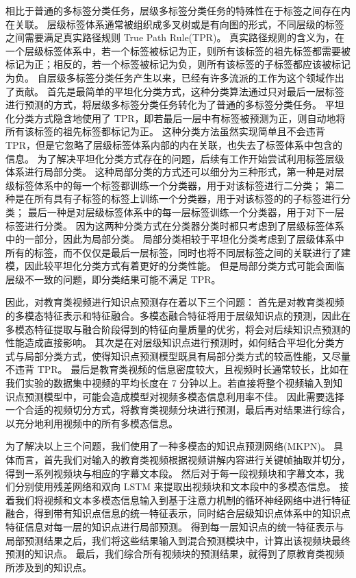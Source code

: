     相比于普通的多标签分类任务，层级多标签分类任务的特殊性在于标签之间存在内在关联。
    层级标签体系通常被组织成多叉树或是有向图的形式，不同层级的标签之间需要满足真实路径规则 True Path Rule(TPR)\cite{Valentini2009TruePR}。
    真实路径规则的含义为，在一个层级标签体系中，若一个标签被标记为正，则所有该标签的祖先标签都需要被标记为正；相反的，若一个标签被标记为负，则所有该标签的子标签都应该被标记为负。
    自层级多标签分类任务产生以来，已经有许多流派的工作为这个领域作出了贡献。
    首先是最简单的平坦化分类方式，这种分类算法通过只对最后一层标签\cite{Barbedo2007AutomaticGC}进行预测的方式，将层级多标签分类任务转化为了普通的多标签分类任务。
    平坦化分类方式隐含地使用了 TPR，即若最后一层中有标签被预测为正，则自动地将所有该标签的祖先标签都标记为正。
    这种分类方法虽然实现简单且不会违背 TPR，但是它忽略了层级标签体系内部的内在关联，也失去了标签体系中包含的信息。
    为了解决平坦化分类方式存在的问题，后续有工作开始尝试利用标签层级体系进行局部分类。
    这种局部分类的方式还可以细分为三种形式，第一种是对层级标签体系中的每一个标签都训练一个分类器，用于对该标签进行二分类\cite{CesaBianchi2004IncrementalAF}；
    第二种是在所有具有子标签的标签上训练一个分类器，用于对该标签的的子标签进行分类\cite{Secker2007AnEC}；
    最后一种是对层级标签体系中的每一层标签训练一个分类器\cite{Freitas2007ATO}，用于对下一层标签进行分类。
    因为这两种分类方式在分类器分类时都只考虑到了层级标签体系中的一部分，因此为局部分类。
    局部分类相较于平坦化分类考虑到了层级体系中所有的标签，而不仅仅是最后一层标签，同时也将不同层标签之间的关联进行了建模，因此较平坦化分类方式有着更好的分类性能。
    但是局部分类方式可能会面临层级不一致的问题，即分类结果可能不满足 TPR。

    因此，对教育类视频进行知识点预测存在着以下三个问题：
    首先是对教育类视频的多模态特征表示和特征融合。多模态融合特征将用于层级知识点的预测，因此在多模态特征提取与融合阶段得到的特征向量质量的优劣，将会对后续知识点预测的性能造成直接影响。
    其次是在对层级知识点进行预测时，如何结合平坦化分类方式与局部分类方式，使得知识点预测模型既具有局部分类方式的较高性能，又尽量不违背 TPR。
    最后是教育类视频的信息密度较大，且视频时长通常较长，比如在我们实验的数据集中视频的平均长度在 7 分钟以上。若直接将整个视频输入到知识点预测模型中，可能会造成模型对视频多模态信息利用率不佳。
    因此需要选择一个合适的视频切分方式，将教育类视频分块进行预测，最后再对结果进行综合，以充分地利用视频中的所有多模态信息。

    为了解决以上三个问题，我们使用了一种多模态的知识点预测网络(MKPN)。
    具体而言，首先我们对输入的教育类视频根据视频讲解内容进行关键帧抽取并切分，得到一系列视频块与相应的字幕文本段。
    然后对于每一段视频块和字幕文本，我们分别使用残差网络和双向 LSTM 来提取出视频块和文本段中的多模态信息。
    接着我们将视频和文本多模态信息输入到基于注意力机制的循环神经网络中进行特征融合，得到带有知识点信息的统一特征表示，同时结合层级知识点体系中的知识点特征信息对每一层的知识点进行局部预测。
    得到每一层知识点的统一特征表示与局部预测结果之后，我们将这些结果输入到混合预测模块中，计算出该视频块最终预测的知识点。
    最后，我们综合所有视频块的预测结果，就得到了原教育类视频所涉及到的知识点。

